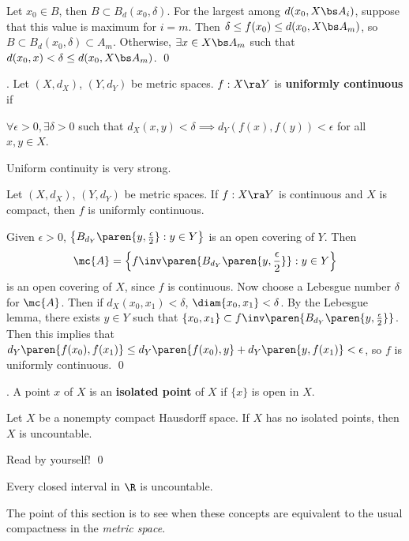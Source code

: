 Let \(x_0 \in B\), then \(B \subset B_d(x_0, \delta)\). For the largest among \(d(x_0, X \bs A_i)\), suppose that this value is maximum for \(i = m\). Then \(\delta \leq f(x_0) \leq d(x_0, X \bs A_m)\), so \(B \subset B_d(x_0, \delta) \subset A_m\). Otherwise, \(\exists x \in X \bs A_m\) such that \(d(x_0, x) < \delta \leq d(x_0, X \bs A_m)\). \qed

.  Let \((X, d_X)\), \((Y, d_Y)\) be metric spaces. \(f: X \ra Y\) is \textbf{uniformly continuous} if
\begin{center}
    \(\forall \epsilon > 0, \exists \delta > 0\) such that \(d_X(x, y) < \delta \implies d_Y(f(x), f(y)) < \epsilon\) for all \(x, y \in X\).
\end{center}

Uniform continuity is very strong.

  Let \((X, d_X)\), \((Y, d_Y)\) be metric spaces. If \(f : X \ra Y\) is continuous and \(X\) is compact, then \(f\) is uniformly continuous.

\pf Given \(\epsilon > 0\), \(\left\{B_{d_Y}\paren{y, \frac{\epsilon}{2}} : y \in Y\right\}\) is an open covering of \(Y\). Then
\[
    \mc{A} = \left\{f\inv\paren{B_{d_Y}\paren{y, \frac{\epsilon}{2}}} : y \in Y\right\}
\]
is an open covering of \(X\), since \(f\) is continuous. Now choose a Lebesgue number \(\delta\) for \(\mc{A}\). Then if \(d_X(x_0, x_1) < \delta\), \(\diam\{x_0, x_1\} < \delta\). By the Lebesgue lemma, there exists \(y \in Y\) such that \(\{x_0, x_1\} \subset f\inv\paren{B_{d_Y}\paren{y, \frac{\epsilon}{2}}}\). Then this implies that \(d_Y\paren{f(x_0), f(x_1)} \leq d_Y\paren{f(x_0), y} + d_Y\paren{y, f(x_1)} < \epsilon\), so \(f\) is uniformly continuous. \qed

.  A point \(x\) of \(X\) is an \textbf{isolated point} of \(X\) if \(\{x\}\) is open in \(X\).

 Let \(X\) be a nonempty compact Hausdorff space. If \(X\) has no isolated points, then \(X\) is uncountable.

\pf Read by yourself! \qed

 Every closed interval in \(\R\) is uncountable.

\pagebreak


The point of this section is to see when these concepts are equivalent to the usual compactness in the \textit{metric space}.

